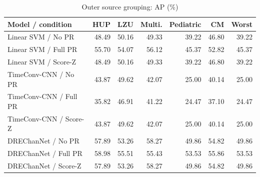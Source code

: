 \begin{table}[t]
\centering
\caption{Outer source grouping: AP (\%)}
\small
\begin{tabular}{lrrrrrr}
\toprule
Model / condition & HUP & LZU & Multi. & Pediatric & CM & Worst \\
\midrule
Linear SVM / No PR & 48.49 & 50.16 & 49.33 & 39.22 & 46.80 & 39.22 \\
Linear SVM / Full PR & 55.70 & 54.07 & 56.12 & 45.37 & 52.82 & 45.37 \\
Linear SVM / Score-Z & 48.49 & 50.16 & 49.33 & 39.22 & 46.80 & 39.22 \\
TimeConv-CNN / No PR & 43.87 & 49.62 & 42.07 & 25.00 & 40.14 & 25.00 \\
TimeConv-CNN / Full PR & 35.82 & 46.91 & 41.22 & 24.47 & 37.10 & 24.47 \\
TimeConv-CNN / Score-Z & 43.87 & 49.62 & 42.07 & 25.00 & 40.14 & 25.00 \\
DREChanNet / No PR & 57.89 & 53.26 & 58.27 & 49.86 & 54.82 & 49.86 \\
DREChanNet / Full PR & 58.98 & 55.51 & 55.43 & 53.53 & 55.86 & 53.53 \\
DREChanNet / Score-Z & 57.89 & 53.26 & 58.27 & 49.86 & 54.82 & 49.86 \\
\bottomrule
\end{tabular}
\end{table}
